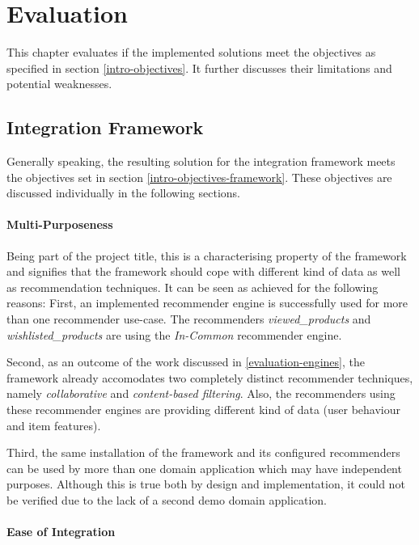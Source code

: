 \chapter{Evaluation}

This chapter evaluates if the implemented solutions meet the objectives as specified in section \ref{intro-objectives}. It further discusses their limitations and potential weaknesses.

\section{Integration Framework}
\label{evaluation-framework}

Generally speaking, the resulting solution for the integration framework meets the objectives set in section \ref{intro-objectives-framework}. These objectives are discussed individually in the following sections.

\subsubsection{Multi-Purposeness}
\label{evaluation-framework-multipurposeness}

Being part of the project title, this is a characterising property of the framework and signifies that the framework should cope with different kind of data as well as recommendation techniques. It can be seen as achieved for the following reasons: First, an implemented recommender engine is successfully used for more than one recommender use-case. The recommenders \emph{viewed_products} and \emph{wishlisted_products} are using the \emph{In-Common} recommender engine.

Second, as an outcome of the work discussed in \ref{evaluation-engines}, the framework already accomodates two completely distinct recommender techniques, namely \emph{collaborative} and \emph{content-based filtering}. Also, the recommenders using these recommender engines are providing different kind of data (user behaviour and item features).

Third, the same installation of the framework and its configured recommenders can be used by more than one domain application which may have independent purposes. Although this is true both by design and implementation, it could not be verified due to the lack of a second demo domain application.

\subsubsection{Ease of Integration}

